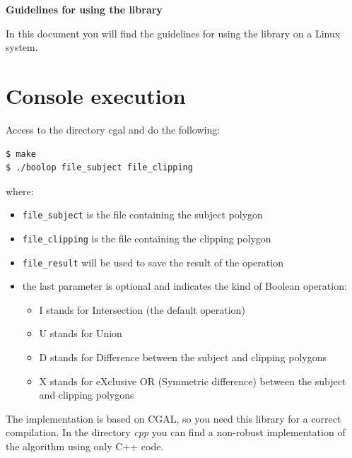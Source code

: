 \documentclass[a4paper]{article}
\begin{document}
\lstset{language=C++, basicstyle=\small, showstringspaces=false}

\begin{center}
\textbf{\LARGE Guidelines for using the library}
\end{center}

\vspace{1cm}
\noindent In this document you will find the guidelines for using the library on a Linux system.

%
%

\section{Console execution}

Access to the directory cgal and do the following:

\begin{verbatim}
$ make
$ ./boolop file_subject file_clipping
\end{verbatim}

\noindent where:

\begin{itemize}
 \item \verb+file_subject+ is the file containing the subject polygon
 \item \verb+file_clipping+ is the file containing the clipping polygon
 \item \verb+file_result+ will be used to save the result of the operation
 \item the last parameter is optional and indicates the kind of Boolean operation:
   \begin{itemize}
    \item I stands for Intersection (the default operation)
    \item U stands for Union
    \item D stands for Difference between the subject and clipping polygons
    \item X stands for eXclusive OR (Symmetric difference) between the subject and clipping polygons
   \end{itemize}
\end{itemize}

The implementation is based on CGAL, so you need this library for a correct compilation. In the directory \textit{cpp} you can find a
non-robust implementation of the algorithm using only C++ code.
\end{document}
